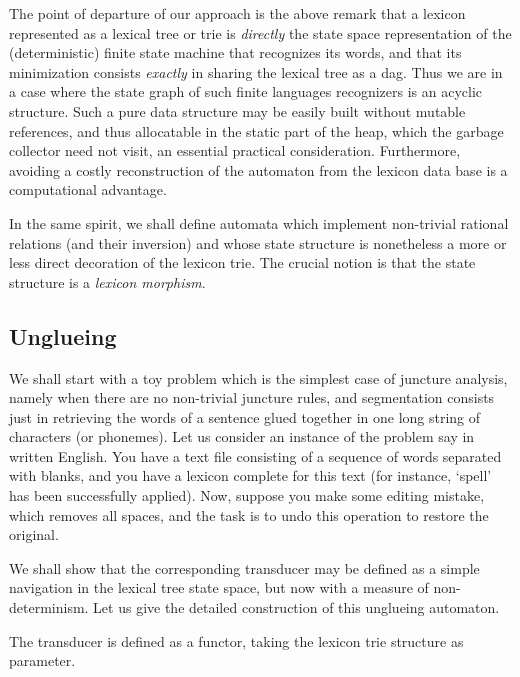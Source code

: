 The point of departure of our approach is the above remark that a lexicon 
represented as a lexical tree or trie is {\sl directly} the state space 
representation of the (deterministic) finite state machine that recognizes 
its words, and that its minimization consists {\sl exactly} in sharing
the lexical tree as a dag. Thus we are in a case where the state graph 
of such finite languages recognizers is an acyclic structure. Such
a pure data structure may be easily built without mutable references, and thus
allocatable in the static part of the heap, which the garbage collector need
not visit, an essential practical consideration. Furthermore, avoiding 
a costly reconstruction of the automaton from the lexicon data base is a 
computational advantage.

In the same spirit, we shall define automata which implement non-trivial 
rational relations (and their inversion) and whose state structure is 
nonetheless a more or less direct decoration of the lexicon trie. The crucial
notion is that the state structure is a {\sl lexicon morphism}.

\subsection{Unglueing}

We shall start with a toy problem which is the simplest case of juncture
analy\-sis, namely when there are no non-trivial juncture rules, and 
segmentation consists just in retrieving the words of a sentence
glued together in one long string of characters (or phonemes). 
Let us consider an instance of
the problem say in written English. You have a text file
consisting of a sequence of words separated with blanks, and you have
a lexicon complete for this text (for instance, `spell' has been successfully
applied). Now, suppose you make some editing mistake, which removes all
spaces, and the task is to undo this operation to restore the original.

We shall show that the corresponding transducer may be defined as a simple
navigation in the lexical tree state space, but now with a measure of
non-determinism. Let us give the detailed construction of this unglueing
automaton. 

The transducer is defined as a functor, taking the lexicon trie structure
as parameter.

